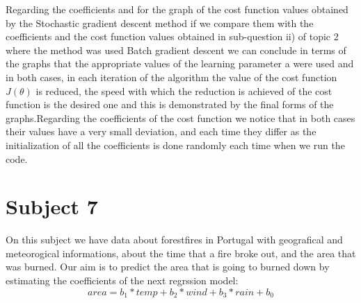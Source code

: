 \documentclass[10pt,a4paper]{article}
\begin{document}
	
	Regarding the coefficients and for the graph of the cost function values obtained by the Stochastic gradient descent method if we compare them with the coefficients and the cost function values obtained in sub-question ii) of topic 2 where the method was used Batch gradient descent we can conclude in terms of the graphs that the appropriate values of the learning parameter a were used and in both cases, in each iteration of the algorithm the value of the cost function $J(\theta)$ is reduced, the speed with which the reduction is achieved of the cost function is the desired one and this is demonstrated by the final forms of the graphs.Regarding the coefficients of the cost function we notice that in both cases their values have a very small deviation, and each time they differ as the initialization of all the coefficients is done randomly each time when we run the code.
	
	\section{Subject 7}
On this subject we have data about forestfires in Portugal with geografical and meteorogical informations, about the time that a fire broke out, and the area that was burned. Our aim is to predict the area that is going to burned down by estimating the coefficients of the next regrssion model:
	\smallskip
	\[area = b_{1}*temp + b_{2}*wind +b_{3}*rain +b_{0}  \]
\end{document}
